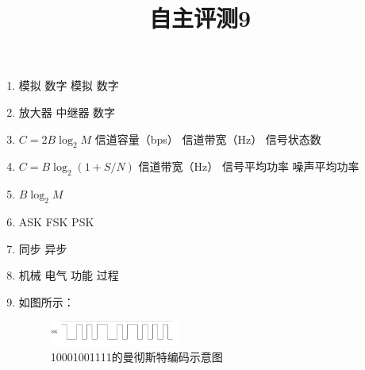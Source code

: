 \documentclass[11pt]{article}
\title{自主评测9}
\date{}
\author{}
\begin{document}
\maketitle

\begin{enumerate}
    \item 模拟 \quad 数字 \quad 模拟 \quad 数字
    \item 放大器 \quad 中继器 \quad 数字
    \item $C=2B\log_{2}{M}$ \quad 信道容量（bps） \quad 信道带宽（Hz） \quad 信号状态数
    \item $C=B\log_{2}{(1+S/N)}$ \quad 信道带宽（Hz） \quad 信号平均功率 \quad 噪声平均功率
    \item $B\log_{2}{M}$
    \item ASK \quad FSK \quad PSK
    \item 同步 \quad 异步
    \item 机械 \quad 电气 \quad 功能 \quad 过程
    \item 如图所示：
    \begin{figure}[htbp]
        \centering
        \includegraphics[width = 0.4\textwidth]{wave.jpg}
        \caption{10001001111的曼彻斯特编码示意图}
    \end{figure}
\end{enumerate}
\end{document}
